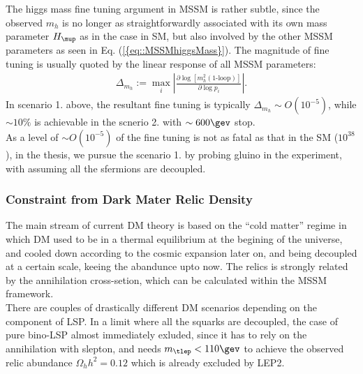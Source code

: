 The higgs mass fine tuning argument in MSSM is rather subtle, since the observed $m_{h}$ is no longer 
as straightforwardly associated with its own mass parameter $H_\mup$ as in the case in SM, but also involved by the other MSSM parameters as seen in Eq. (\ref{{eq::MSSMhiggsMass}}).
The magnitude of fine tuning is usually quoted by the linear response of all MSSM parameters:
\begin{align}
\Delta_{m_{h}} := \max_i \left|  \frac{\partial \log [m^2_h (\mbox{1-loop})] }{\partial \log{p_i}} \right|.
\end{align}
In scenario 1. above, the resultant fine tuning is typically $\Delta_{m_{h}} \sim O(10^{-5})$, while $\sim 10\%$ is achievable in the scnerio 2. with $\sim 600\gev$ stop.  \\
%
As a level of $\sim O(10^{-5})$ of the fine tuning is not as fatal as that in the SM ($10^{38}$),
in the thesis, we pursue the scenario 1. by probing gluino in the experiment, with assuming all the sfermions are decoupled.
%


\subsubsection{Constraint from Dark Mater Relic Density} \label{sec::Introduction::DMconstraint}
The main stream of current DM theory is based on the ``cold matter'' regime in which DM used to be in a thermal equilibrium at the begining of the universe, and cooled down according to the cosmic expansion later on, and being decoupled at a certain scale, keeing the abandunce upto now. The relics is strongly related by the annihilation cross-setion, which can be calculated within the MSSM framework. \\

There are couples of drastically different DM scenarios depending on the component of LSP.
In a limit where all the squarks are decoupled, the case of pure bino-LSP almost immediately exluded, since it has to rely on the annihilation with slepton, 
and needs $m_{\tlep}<110\gev$ to achieve the observed relic abundance $\Omega_h h^2= 0.12$ which is already excluded by LEP2. \\

